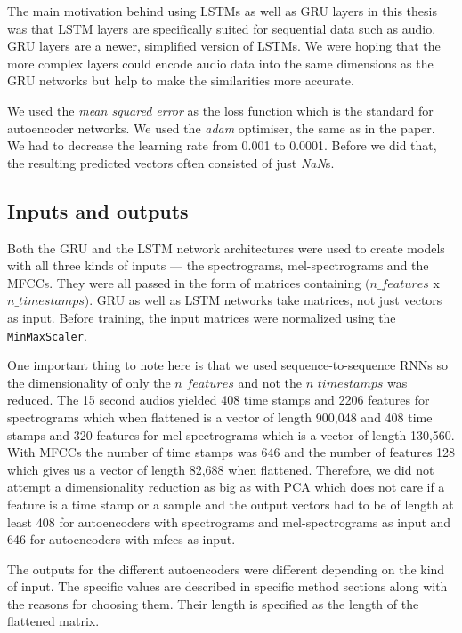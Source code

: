 The main motivation behind using LSTMs as well as GRU layers in this thesis was that LSTM layers are specifically suited for sequential data such as audio. GRU layers are a newer, simplified version of LSTMs. We were hoping that the more complex layers could encode audio data into the same dimensions as the GRU networks but help to make the similarities more accurate. 



We used the \textit{mean squared error} as the loss function which is the standard for autoencoder networks. We used the \textit{adam} optimiser, the same as in the \cite{inproceedings_RNNs} paper. We had to decrease the learning rate from 0.001 to 0.0001. Before we did that, the resulting predicted vectors often consisted of just \textit{NaN}s.

\subsection{Inputs and outputs}
Both the GRU and the LSTM network architectures were used to create models with all three kinds of inputs --- the spectrograms, mel-spectrograms and the MFCCs. They were all passed in the form of matrices containing $(n\_features $ x $n\_timestamps)$. GRU as well as LSTM networks take matrices, not just vectors as input. Before training, the input matrices were normalized using the \texttt{MinMaxScaler}. 

One important thing to note here is that we used sequence-to-sequence RNNs so the dimensionality of only the $ n\_features $ and not the $ n\_timestamps $ was reduced. The 15 second audios yielded 408 time stamps and 2206 features for spectrograms which when flattened is a vector of length 900,048 and 408 time stamps and 320 features for mel-spectrograms which is a vector of length 130,560. With MFCCs the number of time stamps was 646 and the number of features 128 which gives us a vector of length 82,688 when flattened. Therefore, we did not attempt a dimensionality reduction as big as with PCA which does not care if a feature is a time stamp or a sample and the output vectors had to be of length at least 408 for autoencoders with spectrograms and mel-spectrograms as input and 646 for autoencoders with mfccs as input. 

The outputs for the different autoencoders were different depending on the kind of input. The specific values are described in specific method sections along with the reasons for choosing them. Their length is specified as the length of the flattened matrix.


